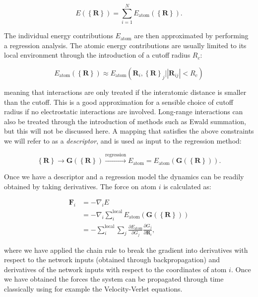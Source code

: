 \begin{equation}
 E(\left\{\bm{R}\right\}) = \sum_{i=1}^N E_{\text{atom}}
 (\left\{\bm{R}\right\}) . 
\end{equation}

The individual energy contributions $E_{\text{atom}}$
are then approximated by performing a regression analysis.
The atomic energy contributions are usually limited to its
local environment through the introduction of a cutoff radius $R_c$:

\begin{equation}
 E_{\text{atom}} (\left\{\bm{R}\right\}) \approx
    E_{\text{atom}} (\bm{R}_i, \left\{\bm{R}\right\}_j 
    | \left| \bm{R}_{ij} \right|
    < R_c) 
\end{equation}

meaning that interactions are only treated if the interatomic distance
is smaller than the cutoff. This is a good approximation for a sensible
choice of cutoff radius if no electrostatic interactions are involved.
Long-range interactions can also be treated through
the introduction of methods such as Ewald summation, but this will
not be discussed here.
A mapping that satisfies the above constraints we will refer to
as a \textit{descriptor}, and is used as input to the regression method:

\begin{equation}
    \left\{\bm{R}\right\} \rightarrow \bm{G}(\left\{\bm{R}\right\}) 
    \overset{\text{regression}}
    {\longrightarrow} E_{\text{atom}} =
    E_{\text{atom}}(\bm{G}(\left\{\bm{R}\right\})). 
\end{equation}

Once we have a descriptor and a regression model the dynamics
can be readily obtained by taking derivatives. The force on atom
$i$ is calculated as:

\begin{equation}
\begin{split}
    \bm{F}_i &= -\nabla_i E \\
    &= -\nabla_i \sum_i^{\text{local}}
    E_{\text{atom}}(\bm{G}(\left\{\bm{R}\right\})) \\
    &= -\sum_i^{\text{local}} \sum_j \frac{\partial E_{\text{atom}}}
    {\partial G_j} \frac{\partial G_j}{\partial \bm{R}_i} ,
\end{split}
\end{equation}

where we have applied the chain rule to break the gradient
into derivatives with respect to the network inputs (obtained through
backpropagation) and derivatives of the network inputs with
respect to the coordinates of atom $i$.
Once we have obtained the forces the system can be propagated through time
classically using for example the Velocity-Verlet equations.

